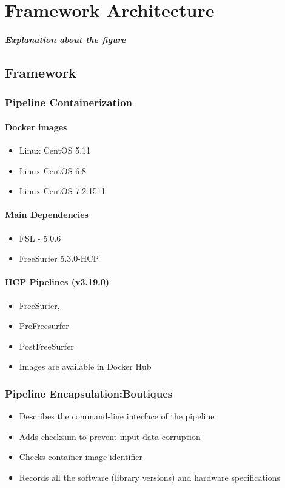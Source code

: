 \chapter{Framework Architecture}
\paragraph{Explanation about the figure}

\section{Framework}
\subsection{Pipeline Containerization}
\subsubsection{Docker images}
\begin{itemize}
  \item Linux CentOS 5.11
  \item Linux CentOS 6.8 
  \item Linux CentOS 7.2.1511
\end{itemize}

\subsubsection{Main Dependencies}
\begin{itemize}
  \item FSL - 5.0.6
  \item FreeSurfer 5.3.0-HCP
\end{itemize}

\subsubsection{HCP Pipelines (v3.19.0)}
\begin{itemize}
  \item FreeSurfer,
  \item PreFreesurfer
  \item PostFreeSurfer
  \item Images are available in Docker Hub
\end{itemize}

\subsection{Pipeline Encapsulation:Boutiques}
\begin{itemize}
  \item Describes the command-line interface of the pipeline
  \item Adds checksum to prevent input data corruption
  \item Checks container image identifier
  \item Records all the software (library versions) and hardware specifications
\end{itemize}


